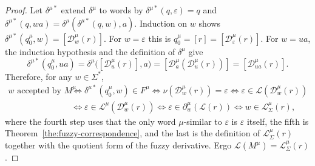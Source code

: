 \begin{proof}
Let $\delta^{\mu *}$ extend $\delta^{\mu}$ to words by
$\delta^{\mu *}(q,\varepsilon)=q$ and
$\delta^{\mu *}(q,wa)=\delta^{\mu}(\delta^{\mu *}(q,w),a)$. Induction on $w$
shows $\delta^{\mu *}(q_0^{\mu},w)=[\mathcal{D}_w^{\mu}(r)]$. For $w=\varepsilon$ this
is $q_0^{\mu}=[r]=[\mathcal{D}_\varepsilon^{\mu}(r)]$. For $w=ua$, the induction
hypothesis and the definition of $\delta^{\mu}$ give
\[
\delta^{\mu *}(q_0^{\mu},ua)
= \delta^{\mu}\bigl([\mathcal{D}_u^{\mu}(r)],a\bigr)
= [\mathcal{D}_a^{\mu}(\mathcal{D}_u^{\mu}(r))]
= [\mathcal{D}_{ua}^{\mu}(r)].
\]
Therefore, for any $w\in\Sigma^{*}$,
\[
\begin{aligned}
w \text{ accepted by } M^{\mu}
&\iff \delta^{\mu *}(q_0^{\mu},w)\in F^{\mu}
 \iff \nu(\mathcal{D}_w^{\mu}(r))=\varepsilon
 \iff \varepsilon\in\mathcal{L}(\mathcal{D}_w^{\mu}(r)) \\
&\iff \varepsilon\in\mathcal{L}^{\mu}(\mathcal{D}_w^{\mu}(r))
 \iff \varepsilon\in\partial_w^{\mu}(\mathcal{L}(r))
 \iff w\in\mathcal{L}_\Sigma^{\mu}(r),
\end{aligned}
\]
where the fourth step uses that the only word $\mu$-similar to $\varepsilon$ is
$\varepsilon$ itself, the fifth is Theorem~\ref{the:fuzzy-correspondence}, and the
last is the definition of $\mathcal{L}_\Sigma^{\mu}(r)$ together with the quotient
form of the fuzzy derivative. Ergo $\mathcal{L}(M^{\mu})=\mathcal{L}_\Sigma^{\mu}(r)$.
\end{proof}
